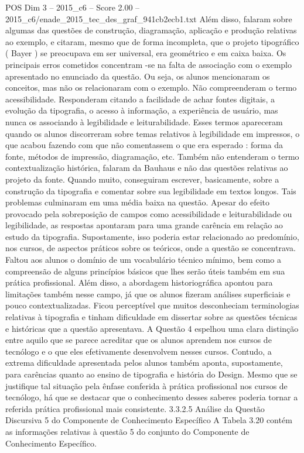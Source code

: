 \begin{textsample}{POS Dim 3 – 2015\_c6 – Score 2.00 – 2015\_c6/enade\_2015\_tec\_des\_graf\_941cb2ecb1.txt}
Além disso, falaram sobre algumas das questões de construção, diagramação, aplicação e produção relativas ao exemplo, e citaram, mesmo que de forma incompleta, que o projeto tipográfico ( Bayer ) se preocupava em ser universal, era geométrico e em caixa baixa.
Os principais erros cometidos concentram -se na falta de associação com o exemplo apresentado no enunciado da questão.
Ou seja, os alunos mencionaram os conceitos, mas não os relacionaram com o exemplo.
Não compreenderam o termo acessibilidade.
Responderam citando a facilidade de achar fontes digitais, a evolução da tipografia, o acesso à informação, a experiência de usuário, mas nunca os associando à legibilidade e leiturabilidade.
Esses termos apareceram quando os alunos discorreram sobre temas relativos à legibilidade em impressos, o que acabou fazendo com que não comentassem o que era esperado : forma da fonte, métodos de impressão, diagramação, etc.
Também não entenderam o termo contextualização histórica, falaram da Bauhaus e não das questões relativas ao projeto da fonte.
Quando muito, conseguiram escrever, basicamente, sobre a construção da tipografia e comentar sobre sua legibilidade em textos longos.
Tais problemas culminaram em uma média baixa na questão.
Apesar do efeito provocado pela sobreposição de campos como acessibilidade e leiturabilidade ou legibilidade, as respostas apontaram para uma grande carência em relação ao estudo da tipografia.
Supostamente, isso poderia estar relacionado ao predomínio, nos cursos, de aspectos práticos sobre os teóricos, onde a questão se concentrava.
Faltou aos alunos o domínio de um vocabulário técnico mínimo, bem como a compreensão de alguns princípios básicos que lhes serão úteis também em sua prática profissional.
Além disso, a abordagem historiográfica apontou para limitações também nesse campo, já que os alunos fizeram análises superficiais e pouco contextualizadas.
Ficou perceptível que muitos desconheciam terminologias relativas à tipografia e tinham dificuldade em dissertar sobre as questões técnicas e históricas que a questão apresentava.
A Questão 4 espelhou uma clara distinção entre aquilo que se parece acreditar que os alunos aprendem nos cursos de tecnólogo e o que eles efetivamente desenvolvem nesses cursos.
Contudo, a extrema dificuldade apresentada pelos alunos também aponta, supostamente, para carências quanto ao ensino de tipografia e história do Design.
Mesmo que se justifique tal situação pela ênfase conferida à prática profissional nos cursos de tecnólogo, há que se destacar que o conhecimento desses saberes poderia tornar a referida prática profissional mais consistente. 3.3.2.5 Análise da Questão Discursiva 5 do Componente de Conhecimento Específico A Tabela 3.20 contém as informações relativas à questão 5 do conjunto do Componente de Conhecimento Específico.

\end{textsample}
